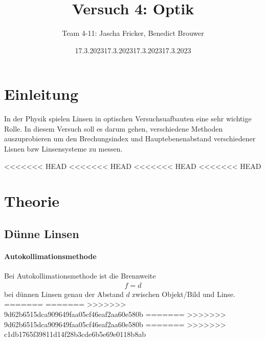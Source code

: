 \documentclass[11pt, a4paper]{article}
\title{Versuch 4: Optik}
\author{Team 4-11: Jascha Fricker, Benedict Brouwer}
\date{17.3.2023}
\date{17.3.2023}
\date{17.3.2023}
\date{17.3.2023}
\begin{document}
    \def\Dimline[#1][#2][#3]{
        \begin{scope}[>=latex] %
            \draw let \p1=#1, \p2=#2, \n0={veclen(\x2-\x1,\y2-\y1)} in [|<->|,
            decoration={markings, %
                    mark=at position 0.5 with {\node[#3] at (0,0) {\DimScale{\n0}};},
            },
            postaction=decorate] #1 -- #2 ;
        \end{scope}
    }

    \def\DimScale#1{\pgfmathparse{round(#1/28.4*10.0)/10.0}\pgfmathresult cm}

    \maketitle

    \tableofcontents

    \newpage

    \section{Einleitung}
    In der Physik spielen Linsen in optischen Versuchsuafbauten eine sehr wichtige Rolle. In diesem Versuch soll es darum gehen, verschiedene 
    Methoden auszuprobieren um den Brechungsindex und Hauptebenenabstand verschiedener Lisnen bzw Linsensysteme zu messen.

<<<<<<< HEAD
<<<<<<< HEAD
<<<<<<< HEAD
<<<<<<< HEAD
    \section{Theorie}

    \subsection{Dünne Linsen}
    \paragraph{Autokollimationsmethode}
    Bei Autokollimationsmethode ist die Brennweite
    \begin{align}
        f = d \label{eq:auto}
    \end{align}
    bei dünnen Linsen genau der Abstand $d$ zwischen Objekt/Bild und Linse.
=======
=======
>>>>>>> 9d62b6515dca909649faa05cf46eaf2aa60e580b
=======
>>>>>>> 9d62b6515dca909649faa05cf46eaf2aa60e580b
=======
>>>>>>> c1db1765f39811d14f28b3cde6b5e69e0118b8ab
\end{document}
